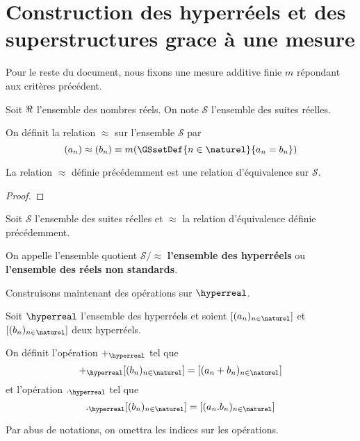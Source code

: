 \chapter{Construction des hyperréels et des superstructures grace à une mesure}

Pour le reste du document, nous fixons une mesure additive finie $m$ répondant
aux critères précédent.

\begin{notation}
	Soit $\real$ l'ensemble des nombres réels. On note $\mathcal{S}$ l'ensemble
	des suites réelles.
\end{notation}

\begin{definition}
	On définit la relation $\approx$ sur l'ensemble $\mathcal{S}$ par
	\begin{equation}
		(a_{n}) \approx (b_{n}) \equiv m(\GSsetDef{n \in \naturel}{a_{n} = b_{n}})
	\end{equation}
\end{definition}

\begin{proposition}
	La relation $\approx$ définie précédemment est une relation d'équivalence sur
	$\mathcal{S}$.
\end{proposition}

\ifdefined\outputproof
\begin{proof}

\end{proof}
\fi

\begin{definition}
	Soit $\mathcal{S}$ l'ensemble des suites réelles et $\approx$ la relation
	d'équivalence définie précédemment.

	On appelle l'ensemble quotient $\mathcal{S} / \approx$ \textbf{l'ensemble des hyperréels} ou
	\textbf{l'ensemble des réels non standards}.
\end{definition}

Construisons maintenant des opérations sur $\hyperreal$.

\begin{definition}
	Soit $\hyperreal$ l'ensemble des hyperréels et soient $[(a_{n})_{n \in
	\naturel}]$ et $[(b_{n})_{n \in \naturel}]$ deux hyperréels.

	On définit l'opération $+_{\hyperreal}$ tel que
	\begin{equation}
		[(a_{n})_{n \in \naturel}] +_{\hyperreal} [(b_{n})_{n \in \naturel}] = [(a_{n} +
		b_{n})_{n \in \naturel}]
	\end{equation}
	et l'opération $._{\hyperreal}$ tel que
	\begin{equation}
		[(a_{n})_{n \in \naturel}] ._{\hyperreal}  [(b_{n})_{n \in \naturel}] =
		[(a_{n} .
		b_{n})_{n \in \naturel}]
	\end{equation}

	Par abus de notations, on omettra les indices sur les opérations.
\end{definition}

